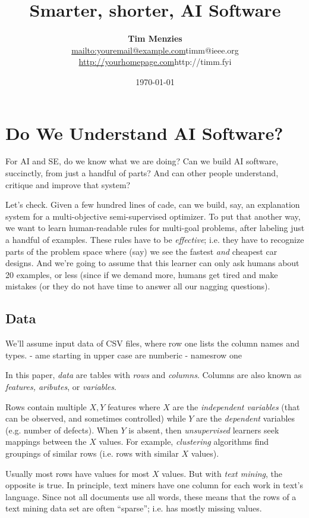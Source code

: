 \documentclass[twocolumn,landscape]{book}
\title{Smarter, shorter, AI Software}
\author{{\bf Tim Menzies}\\ \url{mailto:youremail@example.com}{timm@ieee.org} \\ \url{http://yourhomepage.com}{http://timm.fyi}}
\date{\today}
\begin{document}
\maketitle
\tableofcontents

\chapter{Do We Understand AI Software?}
For AI and SE, do we know what we are doing? 
Can we build AI software, succinctly, from just a handful of parts? And can other people
understand, critique and improve that system?

Let's check. Given a few hundred lines of cade,
can we build, say, an explanation system for a multi-objective semi-supervised optimizer.
To put that another way,
we want to learn human-readable rules for multi-goal problems, after labeling just a handful of examples.
    These  rules have to  be {\em effective}; i.e. they have to  recognize  parts of the problem space where (say) we see the fastest {\em and} cheapest car designs.
And we're going to assume that this learner can only ask humans about 20 examples, or less
(since if we demand more,
    humans get tired and make mistakes  (or they do not have time to answer all our nagging questions).

\section{Data}
We'll assume input data of CSV files, where row one lists the column names and types.
- ame starting in upper case are numberic
- namesrow one 


In this paper,
{\em data} are tables with {\em rows} and {\em columns}.
Columns are also known as
{\em features, aributes}, or
{\em variables}.

Rows contain multiple $X,Y$ features where $X$ are the  {\em independent variables} (that can be observed, and sometimes controlled) while $Y$ are the {\em dependent} variables (e.g. number of defects). When $Y$ is absent,  then {\em unsupervised}  learners seek mappings
between the $X$ values. For example,
{\em clustering} algorithms find groupings of similar rows (i.e. rows with similar $X$ values).

Usually most rows have values for most $X$ values. But with {\em text mining}, the opposite is true. In principle, text miners have one column 
for each work in text's language. Since not all documents use all words, these means that the rows of a text mining data set are often ``sparse''; 
i.e. has mostly missing values.
\end{document}

